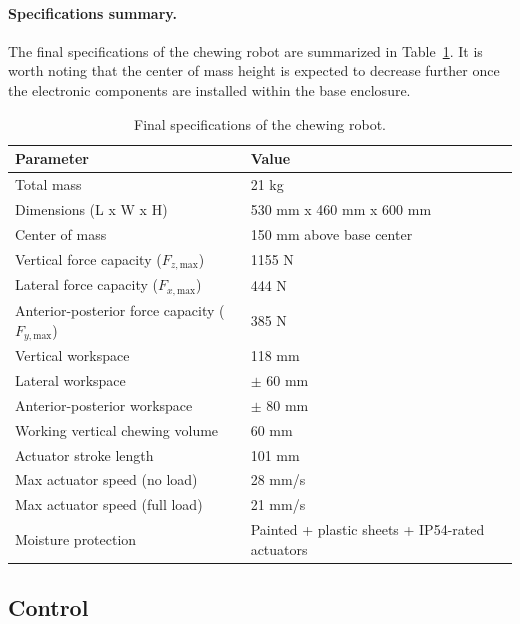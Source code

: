 \paragraph{Specifications summary.}The final specifications of the chewing robot are summarized in Table~\ref{tab:final_specs}. It is worth noting that 
the center of mass height is expected to decrease further once the electronic components are installed within the base enclosure.

\begin{table}[H]
\centering
\begin{tabular}{ l l }
\toprule
\textbf{Parameter} & \textbf{Value} \\
\midrule
Total mass & 21 kg \\
Dimensions (L x W x H) & 530 mm x 460 mm x 600 mm \\
Center of mass & 150 mm above base center \\
Vertical force capacity ($F_{z,\mathrm{max}}$) & 1155 N \\
Lateral force capacity ($F_{x,\mathrm{max}}$) & 444 N \\
Anterior-posterior force capacity ($F_{y,\mathrm{max}}$) & 385 N \\
Vertical workspace & 118 mm \\
Lateral workspace & $\pm$ 60 mm \\
Anterior-posterior workspace & $\pm$ 80 mm \\
Working vertical chewing volume & 60 mm \\
Actuator stroke length & 101 mm \\
Max actuator speed (no load) & 28 mm/s \\
Max actuator speed (full load) & 21 mm/s \\
Moisture protection & Painted + plastic sheets + IP54-rated actuators \\
\bottomrule
\end{tabular}
\caption{Final specifications of the chewing robot.}
\label{tab:final_specs}
\end{table}

\subsection{Control}
\label{sec:control}


